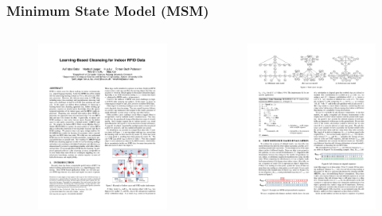 
\begin{frame}
\frametitle{Minimum State Model (MSM)}

\begin{columns}

  \vspace{-10pt}
  \begin{figure}[tb]
    \includegraphics[width=0.75\columnwidth]{figures/3-5/3-5-1.pdf}
  \end{figure}
  \vspace{-20pt}
  \begin{figure}[tb]
    \includegraphics[width=0.75\columnwidth]{figures/3-5/3-5-6.pdf}
  \end{figure}


\end{columns}
\end{frame}
